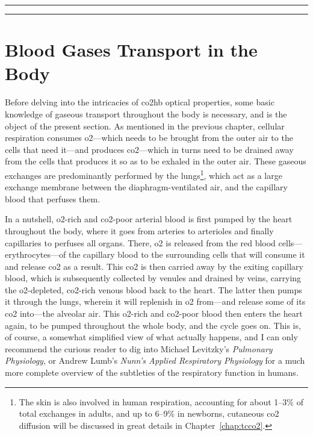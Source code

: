 \vspace{.3cm}\hrule\vspace{.1cm}\hrule\vspace{.3cm}

\section{Blood Gases Transport in the Body}\label{sect:co2hb:blood_gases}

Before delving into the intricacies of \gls{co2hb} optical properties, some basic knowledge of gaseous transport throughout the body is necessary, and is the object of the present section. As mentioned in the previous chapter, cellular respiration consumes \gls{o2}---which needs to be brought from the outer air to the cells that need it---and produces \gls{co2}---which in turns need to be drained away from the cells that produces it so as to be exhaled in the outer air. These gaseous exchanges are predominantly performed by the lungs\footnote{The skin is also involved in human respiration, accounting for about 1--3\% of total exchanges in adults\cite{fitzgerald1957}, and up to 6--9\% in newborns\cite{evans1986}, cutaneous \gls{co2} diffusion will be discussed in great details in Chapter~\ref{chap:tcco2}.}, which act as a large exchange membrane between the diaphragm-ventilated air, and the capillary blood that perfuses them.

In a nutshell, \gls{o2}-rich and \gls{co2}-poor arterial blood is first pumped by the heart throughout the body, where it goes from arteries to arterioles and finally capillaries to perfuses all organs. There, \gls{o2} is released from the red blood cells---\aka{} erythrocytes---of the capillary blood to the surrounding cells that will consume it and release \gls{co2} as a result. This \gls{co2} is then carried away by the exiting capillary blood, which is subsequently collected by venules and drained by veins, carrying the \gls{o2}-depleted, \gls{co2}-rich venous blood back to the heart. The latter then pumps it through the lungs, wherein it will replenish in \gls{o2} from---and release some of its \gls{co2} into---the alveolar air. This \gls{o2}-rich and \gls{co2}-poor blood then enters the heart again, to be pumped throughout the whole body, and the cycle goes on. This is, of course, a somewhat simplified view of what actually happens, and I can only recommend the curious reader to dig into Michael Levitzky's \textit{Pulmonary Physiology}\cite{levitzky2003pulmonary}, or Andrew Lumb's  \textit{Nunn's Applied Respiratory Physiology}\cite{nunns} for a much more complete overview of the subtleties of the respiratory function in humans.

